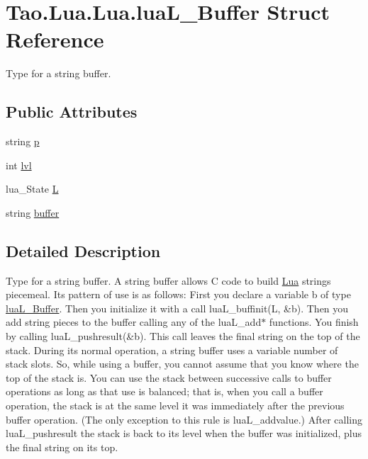 \hypertarget{struct_tao_1_1_lua_1_1_lua_1_1lua_l___buffer}{
\section{Tao.Lua.Lua.luaL\_\-Buffer Struct Reference}
\label{struct_tao_1_1_lua_1_1_lua_1_1lua_l___buffer}
}


Type for a string buffer.  


\subsection*{Public Attributes}
\begin{DoxyCompactItemize}
\item 
string \hyperlink{struct_tao_1_1_lua_1_1_lua_1_1lua_l___buffer_aac23e6b1ca485b28a8af39963e3672ff}{p}
\item 
int \hyperlink{struct_tao_1_1_lua_1_1_lua_1_1lua_l___buffer_a9aab36eef12e587122e55d2b30971849}{lvl}
\item 
lua\_\-State \hyperlink{struct_tao_1_1_lua_1_1_lua_1_1lua_l___buffer_a7e57fbb80f24064133e75fe20fd9d1b0}{L}
\item 
string \hyperlink{struct_tao_1_1_lua_1_1_lua_1_1lua_l___buffer_a637e58ba170ea75e0fee78fa1bc2cc9a}{buffer}
\end{DoxyCompactItemize}


\subsection{Detailed Description}
Type for a string buffer. A string buffer allows C code to build \hyperlink{namespace_tao_1_1_lua}{Lua} strings piecemeal. Its pattern of use is as follows: First you declare a variable b of type \hyperlink{struct_tao_1_1_lua_1_1_lua_1_1lua_l___buffer}{luaL\_\-Buffer}. Then you initialize it with a call luaL\_\-buffinit(L, \&b). Then you add string pieces to the buffer calling any of the luaL\_\-add$\ast$ functions. You finish by calling luaL\_\-pushresult(\&b). This call leaves the final string on the top of the stack. During its normal operation, a string buffer uses a variable number of stack slots. So, while using a buffer, you cannot assume that you know where the top of the stack is. You can use the stack between successive calls to buffer operations as long as that use is balanced; that is, when you call a buffer operation, the stack is at the same level it was immediately after the previous buffer operation. (The only exception to this rule is luaL\_\-addvalue.) After calling luaL\_\-pushresult the stack is back to its level when the buffer was initialized, plus the final string on its top. 

